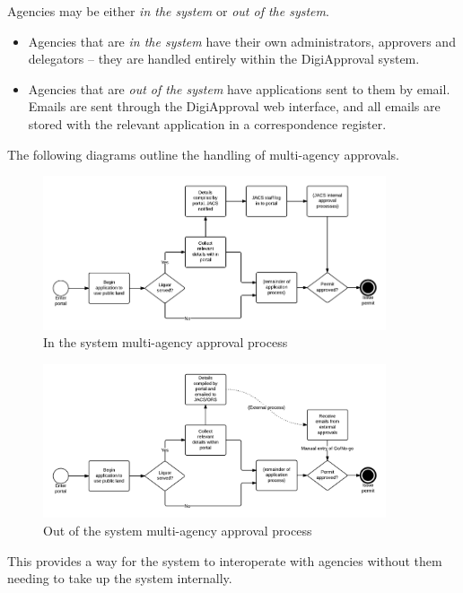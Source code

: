\documentclass[12pt,a4paper,twosided]{article}
\begin{document}
Agencies may be either \emph{in the system} or \emph{out of the system}.

\begin{itemize}
\itemsep1pt\parskip0pt
\item
  Agencies that are \emph{in the system} have their own administrators,
  approvers and delegators -- they are handled entirely within the
  DigiApproval system.
\item
  Agencies that are \emph{out of the system} have applications sent to
  them by email. Emails are sent through the DigiApproval web interface,
  and all emails are stored with the relevant application in a
  correspondence register.
\end{itemize}

The following diagrams outline the handling of multi-agency approvals.

\begin{figure}[htbp]
\centering
\includegraphics[width=0.9\textwidth]{./imgs/workflow-example.png}
\caption{In the system multi-agency approval process}
\end{figure}

\begin{figure}[htbp]
\centering
\includegraphics[width=0.9\textwidth]{./imgs/workflow-example-external.png}
\caption{Out of the system multi-agency approval process}
\end{figure}

This provides a way for the system to interoperate with agencies without
them needing to take up the system internally.
\end{document}

